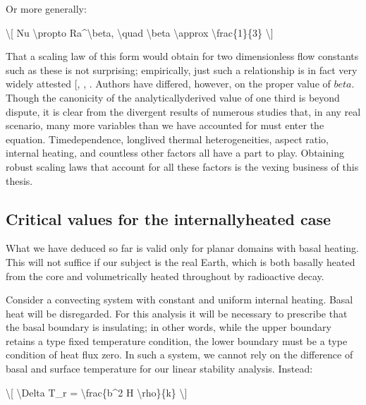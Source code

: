 \documentclass[letterpaper,10pt,english]{jupyterBook}
\begin{document}
\sphinxAtStartPar
Or more generally:

\sphinxAtStartPar
\textbackslash{}{[} Nu \textbackslash{}propto Ra\textasciicircum{}\textbackslash{}beta, \textbackslash{}quad \textbackslash{}beta \textbackslash{}approx \textbackslash{}frac\{1\}\{3\} \textbackslash{}{]}

\sphinxAtStartPar
That a scaling law of this form would obtain for two dimensionless flow constants such as these is not surprising; empirically, just such a relationship is in fact very widely attested {[}, , \sphinxcite{references:id79}{]}. Authors have differed, however, on the proper value of \(beta\). Though the canonicity of the analytically\sphinxhyphen{}derived value of one third is beyond dispute, it is clear from the divergent results of numerous studies that, in any real scenario, many more variables than we have accounted for must enter the equation. Time\sphinxhyphen{}dependence, long\sphinxhyphen{}lived thermal heterogeneities, aspect ratio, internal heating, and countless other factors all have a part to play. Obtaining robust scaling laws that account for all these factors is the vexing business of this thesis.


\subsection{Critical values for the internally\sphinxhyphen{}heated case}
\label{\detokenize{content/chapter_02_methods/section1:critical-values-for-the-internally-heated-case}}
\sphinxAtStartPar
What we have deduced so far is valid only for planar domains with basal heating. This will not suffice if our subject is the real Earth, which is both basally heated from the core and volumetrically heated throughout by radioactive decay.

\sphinxAtStartPar
Consider a convecting system with constant and uniform internal heating. Basal heat will be disregarded. For this analysis it will be necessary to prescribe that the basal boundary is insulating; in other words, while the upper boundary retains a \sphinxhyphen{}type fixed temperature condition, the lower boundary must be a \sphinxhyphen{}type condition of heat flux zero. In such a system, we cannot rely on the difference of basal and surface temperature for our linear stability analysis. Instead:

\sphinxAtStartPar
\textbackslash{}{[} \textbackslash{}Delta T\_r = \textbackslash{}frac\{b\textasciicircum{}2 H \textbackslash{}rho\}\{k\} \textbackslash{}{]}
\end{document}
